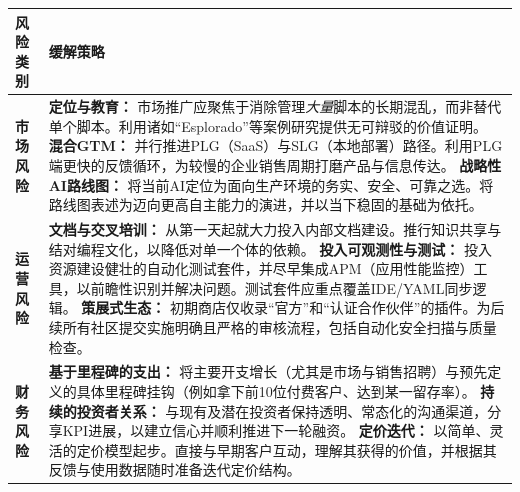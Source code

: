 \documentclass[11pt, a4paper, oneside]{article}
\begin{document}
\begin{table}[H]
\centering
\begin{tabularx}{\textwidth}{@{}lL@{}}
\toprule
\textbf{风险类别} & \textbf{缓解策略} \\
\midrule
\textbf{市场风险} & 
\textbf{定位与教育：} 市场推广应聚焦于消除管理\textit{大量}脚本的长期混乱，而非替代单个脚本。利用诸如“Esplorado”等案例研究提供无可辩驳的价值证明。 \newline\newline
\textbf{混合GTM：} 并行推进PLG（SaaS）与SLG（本地部署）路径。利用PLG端更快的反馈循环，为较慢的企业销售周期打磨产品与信息传达。 \newline\newline
\textbf{战略性AI路线图：} 将当前AI定位为面向生产环境的务实、安全、可靠之选。将路线图表述为迈向更高自主能力的演进，并以当下稳固的基础为依托。 \\
\addlinespace
\textbf{运营风险} & 
\textbf{文档与交叉培训：} 从第一天起就大力投入内部文档建设。推行知识共享与结对编程文化，以降低对单一个体的依赖。 \newline\newline
\textbf{投入可观测性与测试：} 投入资源建设健壮的自动化测试套件，并尽早集成APM（应用性能监控）工具，以前瞻性识别并解决问题。测试套件应重点覆盖IDE/YAML同步逻辑。 \newline\newline
\textbf{策展式生态：} 初期商店仅收录“官方”和“认证合作伙伴”的插件。为后续所有社区提交实施明确且严格的审核流程，包括自动化安全扫描与质量检查。 \\
\addlinespace
\textbf{财务风险} & 
\textbf{基于里程碑的支出：} 将主要开支增长（尤其是市场与销售招聘）与预先定义的具体里程碑挂钩（例如拿下前10位付费客户、达到某一留存率）。 \newline\newline
\textbf{持续的投资者关系：} 与现有及潜在投资者保持透明、常态化的沟通渠道，分享KPI进展，以建立信心并顺利推进下一轮融资。 \newline\newline
\textbf{定价迭代：} 以简单、灵活的定价模型起步。直接与早期客户互动，理解其获得的价值，并根据其反馈与使用数据随时准备迭代定价结构。 \\
\bottomrule
\end{tabularx}
\end{table}

\end{document}
